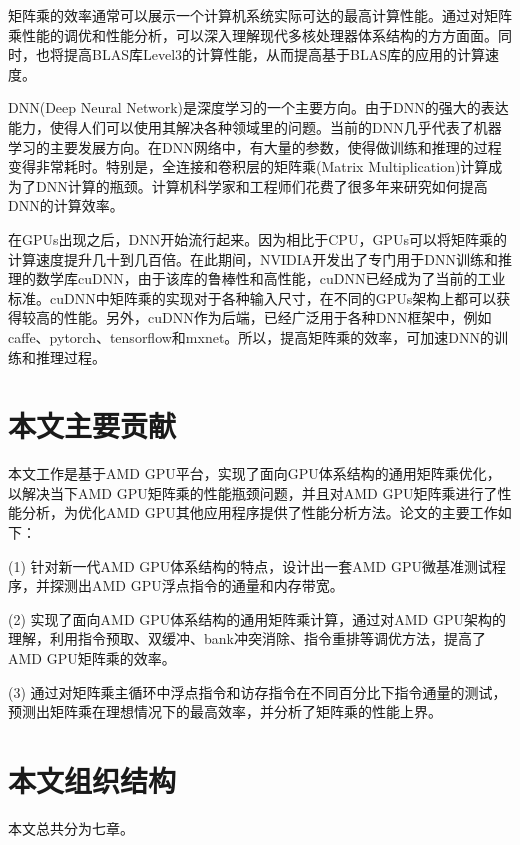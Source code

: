 矩阵乘的效率通常可以展示一个计算机系统实际可达的最高计算性能。通过对矩阵乘性能的调优和性能分析，可以深入理解现代多核处理器体系结构的方方面面。同时，也将提高BLAS库Level3的计算性能，从而提高基于BLAS库的应用的计算速度。

DNN(Deep Neural Network)是深度学习的一个主要方向。由于DNN的强大的表达能力，使得人们可以使用其解决各种领域里的问题。当前的DNN几乎代表了机器学习的主要发展方向。在DNN网络中，有大量的参数，使得做训练和推理的过程变得非常耗时。特别是，全连接和卷积层的矩阵乘(Matrix Multiplication)计算成为了DNN计算的瓶颈。计算机科学家和工程师们花费了很多年来研究如何提高DNN的计算效率。

在GPUs出现之后，DNN开始流行起来。因为相比于CPU，GPUs可以将矩阵乘的计算速度提升几十到几百倍。在此期间，NVIDIA开发出了专门用于DNN训练和推理的数学库cuDNN，由于该库的鲁棒性和高性能，cuDNN已经成为了当前的工业标准。cuDNN中矩阵乘的实现对于各种输入尺寸，在不同的GPUs架构上都可以获得较高的性能。另外，cuDNN作为后端，已经广泛用于各种DNN框架中，例如caffe、pytorch、tensorflow和mxnet。所以，提高矩阵乘的效率，可加速DNN的训练和推理过程。


\section{本文主要贡献}
本文工作是基于AMD GPU平台，实现了面向GPU体系结构的通用矩阵乘优化，以解决当下AMD GPU矩阵乘的性能瓶颈问题，并且对AMD GPU矩阵乘进行了性能分析，为优化AMD GPU其他应用程序提供了性能分析方法。论文的主要工作如下：

%


 (1) 针对新一代AMD GPU体系结构的特点，设计出一套AMD GPU微基准测试程序，并探测出AMD GPU浮点指令的通量和内存带宽。

 (2) 实现了面向AMD GPU体系结构的通用矩阵乘计算，通过对AMD GPU架构的理解，利用指令预取、双缓冲、bank冲突消除、指令重排等调优方法，提高了AMD GPU矩阵乘的效率。

 (3) 通过对矩阵乘主循环中浮点指令和访存指令在不同百分比下指令通量的测试，预测出矩阵乘在理想情况下的最高效率，并分析了矩阵乘的性能上界。


\section{本文组织结构}
本文总共分为七章。

